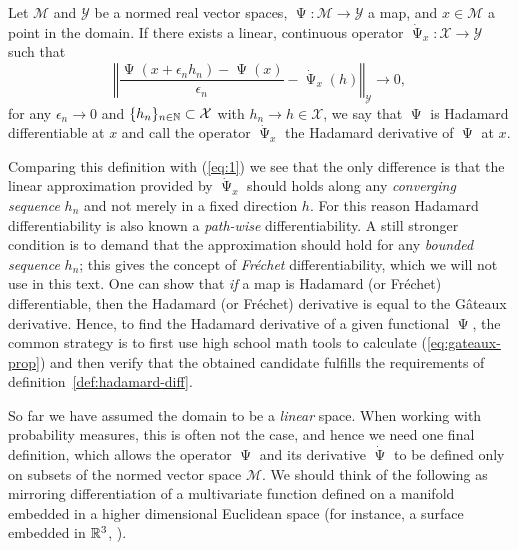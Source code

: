 \documentclass[a4,danish]{article}
\DeclareMathOperator{\TT}{\Psi}
\begin{document}
\begin{definition}
  \label{def:hadamard-diff}
  Let $\mathcal{M}$ and $\mathcal{Y}$ be a normed real vector spaces,
  $\TT \colon \mathcal{M} \rightarrow \mathcal{Y}$ a map, and $x \in \mathcal{M}$ a point in the
  domain. If there exists a linear, continuous operator
  $\dot{\TT}_x \colon \mathcal{X} \rightarrow \mathcal{Y} $ such that
  \begin{equation*}
    \left\Vert
      \frac{\TT(x + \epsilon_n h_n) - \TT(x)}{\epsilon_n} - \dot{\TT}_x(h)
    \right\Vert_{\mathcal{Y}} \longrightarrow 0,
  \end{equation*}
  for any $\epsilon_n \rightarrow 0$ and $\{h_n\}_{n \in \mathbb{N}} \subset \mathcal{X}$ with
  $h_n \rightarrow h \in \mathcal{X}$, we say that $\TT$ is Hadamard differentiable at $x$ and call
  the operator $\dot{\TT}_x$ the Hadamard derivative of $\TT$ at $x$.
\end{definition}

Comparing this definition with (\ref{eq:1}) we see that the only difference is that the linear
approximation provided by $\dot{\TT}_x$ should holds along any \textit{converging sequence} $h_n$
and not merely in a fixed direction $h$. For this reason Hadamard differentiability is also known a
\textit{path-wise} differentiability. A still stronger condition is to demand that the approximation
should hold for any \textit{bounded sequence} $h_n$; this gives the concept of \textit{Fréchet}
differentiability, which we will not use in this text. One can show that \textit{if} a map is
Hadamard (or Fréchet) differentiable, then the Hadamard (or Fréchet) derivative is equal to the
Gâteaux derivative. Hence, to find the Hadamard derivative of a given functional $\TT$, the common
strategy is to first use high school math tools to calculate (\ref{eq:gateaux-prop}) and then verify
that the obtained candidate fulfills the requirements of definition~\ref{def:hadamard-diff}.

So far we have assumed the domain to be a \textit{linear} space. When working with probability
measures, this is often not the case, and hence we need one final definition, which allows the
operator $\TT$ and its derivative $\dot{\TT}$ to be defined only on subsets of the normed vector
space $\mathcal{M}$. We should think of the following as mirroring differentiation of a multivariate
function defined on a manifold embedded in a higher dimensional Euclidean space (for instance, a
surface embedded in $\mathbb{R}^3$, ).
\end{document}
